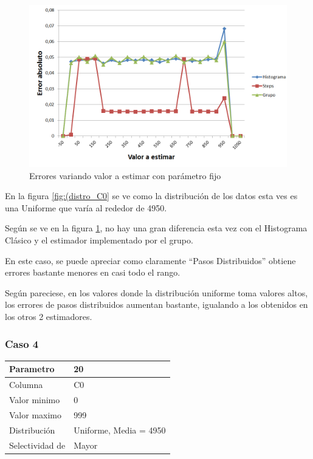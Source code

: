 	\begin{figure}[H]
	  \begin{center}
	    \includegraphics[scale=.60]{imagenes/C0_variando_valor.png}
	    \caption{Errores variando valor a estimar con par\'ametro fijo} 
	    \label{fig:C0_variando_valor}
	  \end{center}
	\end{figure}	
	

		En la figura \ref{fig:(distro_C0} se ve como la distribuci\'on de los datos esta ves es una Uniforme que var\'ia al rededor de 4950.
		
		Seg\'un se ve en la figura \ref{fig:C0_variando_valor}, no hay una gran diferencia esta vez con el Histograma Cl\'asico y el estimador implementado por el grupo. 
		
		En este caso, se puede apreciar como claramente ``Pasos Distribuidos'' obtiene errores bastante menores en casi todo el rango.
		
		Seg\'un pareciese, en los valores donde la distribuci\'on uniforme toma valores altos, los errores de pasos distribuidos aumentan bastante, igualando a los obtenidos en los otros 2 estimadores.

	\newpage

		\subsubsection*{Caso 4}
		
		\begin{tabular}{| l | l |}
		\hline
		Parametro & 20 \\
		\hline
		Columna & C0 \\
		\hline
		Valor minimo & 0 \\
		\hline
		Valor maximo & 999 \\
		\hline
		Distribuci\'on & Uniforme, Media = 4950 \\
		\hline
		Selectividad de & Mayor \\
		\hline
		\end{tabular}	
		
